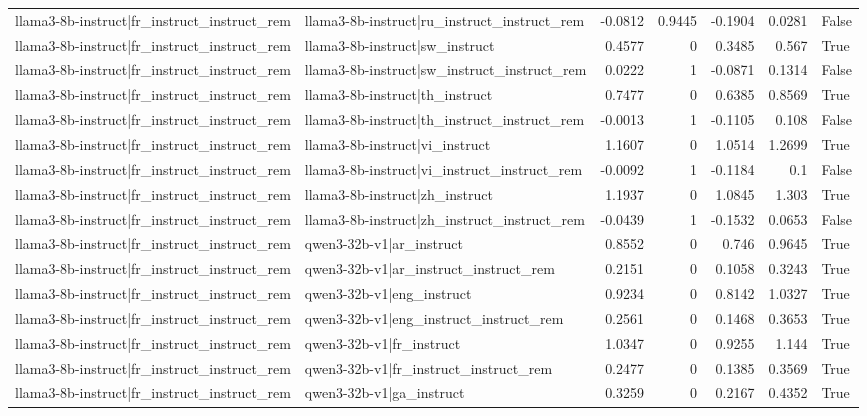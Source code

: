 \begin{table}
\begin{tabular}{l l r r r r l}
llama3-8b-instruct|fr_instruct_instruct_rem & llama3-8b-instruct|ru_instruct_instruct_rem & -0.0812 & 0.9445 & -0.1904 & 0.0281 & False \\
llama3-8b-instruct|fr_instruct_instruct_rem & llama3-8b-instruct|sw_instruct & 0.4577 & 0 & 0.3485 & 0.567 & True \\
llama3-8b-instruct|fr_instruct_instruct_rem & llama3-8b-instruct|sw_instruct_instruct_rem & 0.0222 & 1 & -0.0871 & 0.1314 & False \\
llama3-8b-instruct|fr_instruct_instruct_rem & llama3-8b-instruct|th_instruct & 0.7477 & 0 & 0.6385 & 0.8569 & True \\
llama3-8b-instruct|fr_instruct_instruct_rem & llama3-8b-instruct|th_instruct_instruct_rem & -0.0013 & 1 & -0.1105 & 0.108 & False \\
llama3-8b-instruct|fr_instruct_instruct_rem & llama3-8b-instruct|vi_instruct & 1.1607 & 0 & 1.0514 & 1.2699 & True \\
llama3-8b-instruct|fr_instruct_instruct_rem & llama3-8b-instruct|vi_instruct_instruct_rem & -0.0092 & 1 & -0.1184 & 0.1 & False \\
llama3-8b-instruct|fr_instruct_instruct_rem & llama3-8b-instruct|zh_instruct & 1.1937 & 0 & 1.0845 & 1.303 & True \\
llama3-8b-instruct|fr_instruct_instruct_rem & llama3-8b-instruct|zh_instruct_instruct_rem & -0.0439 & 1 & -0.1532 & 0.0653 & False \\
llama3-8b-instruct|fr_instruct_instruct_rem & qwen3-32b-v1|ar_instruct & 0.8552 & 0 & 0.746 & 0.9645 & True \\
llama3-8b-instruct|fr_instruct_instruct_rem & qwen3-32b-v1|ar_instruct_instruct_rem & 0.2151 & 0 & 0.1058 & 0.3243 & True \\
llama3-8b-instruct|fr_instruct_instruct_rem & qwen3-32b-v1|eng_instruct & 0.9234 & 0 & 0.8142 & 1.0327 & True \\
llama3-8b-instruct|fr_instruct_instruct_rem & qwen3-32b-v1|eng_instruct_instruct_rem & 0.2561 & 0 & 0.1468 & 0.3653 & True \\
llama3-8b-instruct|fr_instruct_instruct_rem & qwen3-32b-v1|fr_instruct & 1.0347 & 0 & 0.9255 & 1.144 & True \\
llama3-8b-instruct|fr_instruct_instruct_rem & qwen3-32b-v1|fr_instruct_instruct_rem & 0.2477 & 0 & 0.1385 & 0.3569 & True \\
llama3-8b-instruct|fr_instruct_instruct_rem & qwen3-32b-v1|ga_instruct & 0.3259 & 0 & 0.2167 & 0.4352 & True \\

\end{tabular}
\end{table}
